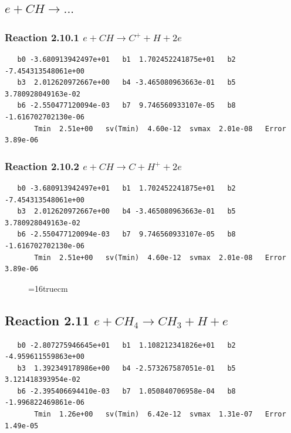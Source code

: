 \documentclass[12pt,dvipdfmx]{article}
\begin{document}
\subsection{
$e + CH \rightarrow ... $
}

\subsubsection{
Reaction 2.10.1   $e + CH \rightarrow C^+ + H + 2e $
}

\begin{small}\begin{verbatim}
   b0 -3.680913942497e+01   b1  1.702452241875e+01   b2 -7.454313548061e+00
   b3  2.012620972667e+00   b4 -3.465080963663e-01   b5  3.780928049163e-02
   b6 -2.550477120094e-03   b7  9.746560933107e-05   b8 -1.616702702130e-06
       Tmin  2.51e+00   sv(Tmin)  4.60e-12  svmax  2.01e-08   Error  3.89e-06
\end{verbatim}\end{small}

\subsubsection{
Reaction 2.10.2   $e + CH \rightarrow C + H^+ + 2e $
}

\begin{small}\begin{verbatim}
   b0 -3.680913942497e+01   b1  1.702452241875e+01   b2 -7.454313548061e+00
   b3  2.012620972667e+00   b4 -3.465080963663e-01   b5  3.780928049163e-02
   b6 -2.550477120094e-03   b7  9.746560933107e-05   b8 -1.616702702130e-06
       Tmin  2.51e+00   sv(Tmin)  4.60e-12  svmax  2.01e-08   Error  3.89e-06
\end{verbatim}\end{small}

\begin{figure} \label{met.2_2.10}
\epsfxsize=16truecm
\end{figure}
\newpage

\subsection{
Reaction 2.11      $e + CH_4 \rightarrow CH_3 + H + e $
}

\begin{small}\begin{verbatim}
   b0 -2.807275946645e+01   b1  1.108212341826e+01   b2 -4.959611559863e+00
   b3  1.392349178986e+00   b4 -2.573267587051e-01   b5  3.121418393954e-02
   b6 -2.395406694410e-03   b7  1.050840706958e-04   b8 -1.996822469861e-06
       Tmin  1.26e+00   sv(Tmin)  6.42e-12  svmax  1.31e-07   Error  1.49e-05
\end{verbatim}\end{small}
\end{document}
